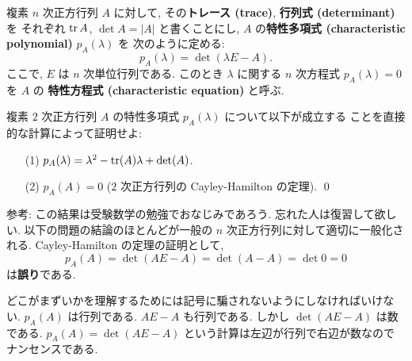 \documentclass[12pt,twoside]{jarticle}
\begin{document}
複素 $n$ 次正方行列 $A$ に対して, 
その{\bf トレース (trace)}, {\bf 行列式 (determinant)} を
それぞれ $\mathop{\mathrm{tr}}\nolimits A$, $\det A = |A|$ と書くことにし, 
$A$ の{\bf 特性多項式 (characteristic polynomial)} $p_A(\lambda)$ を
次のように定める:
\begin{equation*}
  p_A(\lambda) = \det(\lambda E - A).
\end{equation*}
ここで, $E$ は $n$ 次単位行列である. 
このとき $\lambda$ に関する $n$ 次方程式 $p_A(\lambda)=0$ を $A$ の
{\bf 特性方程式 (characteristic equation)} と呼ぶ. 


\begin{question}[簡単過ぎるので3点]
  \label{q:char-poly-2.1}
  複素 $2$ 次正方行列 $A$ の特性多項式 $p_A(\lambda)$ について以下が成立する
  ことを直接的な計算によって証明せよ: 
  \begin{enumerate}
  \item[(1)] \( p_A(\lambda) = \lambda^2 - \mathop{\mathrm{tr}}\nolimits(A)\lambda + \det(A) \).
  \item[(2)] \( p_A(A) = 0 \) \quad ($2$ 次正方行列の Cayley-Hamilton の定理).
  \qed
  \end{enumerate}
\end{question}

\noindent 
参考: この結果は受験数学の勉強でおなじみであろう.
忘れた人は復習して欲しい.  
以下の問題の結論のほとんどが一般の $n$ 次正方行列に対して適切に一般化される. 
Cayley-Hamilton の定理の証明として,
\begin{equation*}
 p_A(A) = \det(AE - A) = \det(A - A) = \det 0 = 0
\end{equation*}
は{\bf 誤り}である. 

どこがまずいかを理解するためには記号に騙されないようにしなければいけない.
$p_A(A)$ は行列である.  $AE - A$ も行列である.  
しかし $\det(AE-A)$ は数である.  
$p_A(A)=\det(AE-A)$ という計算は左辺が行列で右辺が数なのでナンセンスである.
\end{document}
